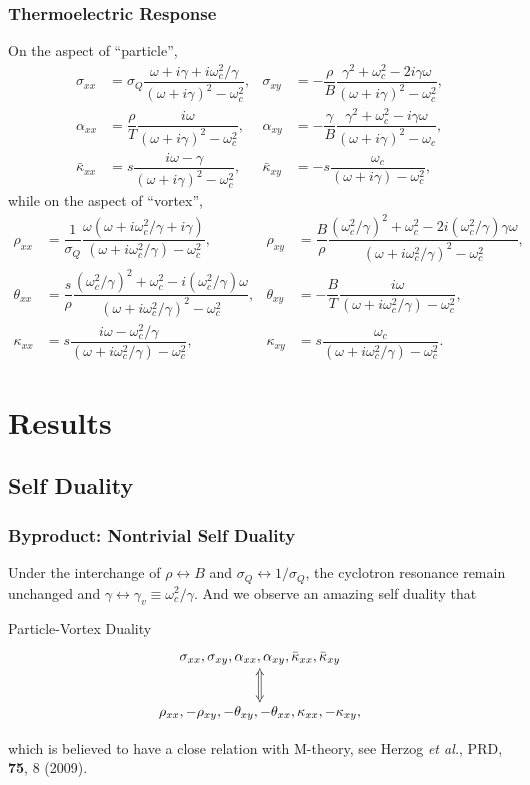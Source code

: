 \documentclass[10pt,aspectratio=43,xcolor=x11names,t]{beamer}%
\begin{document}
		\begin{frame}\frametitle{Thermoelectric Response}
			On the aspect of ``particle'',
				\begin{align*}
					\sigma_{xx}&=\sigma_Q\dfrac{\omega+i\gamma+i\omega_c^2/\gamma}{(\omega+i\gamma)^2-\omega_c^2},&\sigma_{xy}&=-\dfrac{\rho}{B}\dfrac{\gamma^2+\omega_c^2-2i\gamma\omega}{(\omega+i\gamma)^2-\omega_c^2},\\
					\alpha_{xx}&=\dfrac{\rho}{T}\dfrac{i\omega}{(\omega+i\gamma)^2-\omega_c^2},&\alpha_{xy}&=-\dfrac{\gamma}{B}\dfrac{\gamma^2+\omega_c^2-i\gamma\omega}{(\omega+i\gamma)^2-\omega_c},\\
					\bar{\kappa}_{xx}&=s\dfrac{i\omega-\gamma}{(\omega+i\gamma)^2-\omega_c^2},&\bar{\kappa}_{xy}&=-s\dfrac{\omega_c}{(\omega+i\gamma)-\omega_c^2},
				\end{align*}
			while on the aspect of ``vortex'',
			\begin{align*}
				\rho_{xx}&=\dfrac{1}{\sigma_Q}\dfrac{\omega(\omega+i\omega_c^2/\gamma+i\gamma)}{(\omega+i\omega_c^2/\gamma)-\omega_c^2},&\rho_{xy}&=\dfrac{B}{\rho}\dfrac{(\omega_c^2/\gamma)^2+\omega_c^2-2i(\omega_c^2/\gamma)\gamma\omega}{(\omega+i\omega_c^2/\gamma)^2-\omega_c^2},\\
				\theta_{xx}&=\dfrac{s}{\rho}\dfrac{(\omega_c^2/\gamma)^2+\omega_c^2-i(\omega_c^2/\gamma)\omega}{(\omega+i\omega_c^2/\gamma)^2-\omega_c^2},&\theta_{xy}&=-\dfrac{B}{T}\dfrac{i\omega}{(\omega+i\omega_c^2/\gamma)-\omega_c^2},\\
				\kappa_{xx}&=s\dfrac{i\omega-\omega_c^2/\gamma}{(\omega+i\omega_c^2/\gamma)-\omega_c^2},&\kappa_{xy}&=s\dfrac{\omega_c}{(\omega+i\omega_c^2/\gamma)-\omega_c^2}.
			\end{align*}
		\end{frame}


\section{Results}
	\subsection{Self Duality}
		\begin{frame}\frametitle{Byproduct: Nontrivial Self Duality}
			Under the interchange of $\rho\leftrightarrow B$ and $\sigma_Q\leftrightarrow 1/\sigma_Q$, the cyclotron resonance remain unchanged and $\gamma\leftrightarrow\gamma_v\equiv\omega_c^2/\gamma$. And we observe an amazing self duality that
			\begin{redblock}{Particle-Vortex Duality}
				\begin{equation*}
					\xymatrix{\sigma_{xx}, \sigma_{xy}, \alpha_{xx}, \alpha_{xy}, \bar{\kappa}_{xx}, \bar{\kappa}_{xy} \ar@2{<->}[d] \\ \rho_{xx},-\rho_{xy},-\theta_{xy},-\theta_{xx},\kappa_{xx},-\kappa_{xy},}
				\end{equation*}
			\end{redblock}
			which is believed to have a close relation with M-theory, see {\scriptsize Herzog \textit{et al.}, PRD, \textbf{75}, 8 (2009)}.
		\end{frame}
\end{document}
